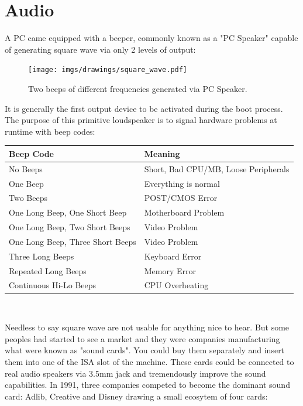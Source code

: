 \documentclass[book.tex]{subfiles}
\begin{document}
\section{Audio}
A PC came equipped with a beeper, commonly known as a "PC Speaker" capable of generating square wave via only 2 levels of output:\\
\par
 \begin{figure}[H]
\centering
\texttt{[image: imgs/drawings/square\_wave.pdf]}
\caption{Two beeps of different frequencies generated via PC Speaker.}
\end{figure}

\par
 It is generally the first output device to be activated during the boot process. The purpose of this primitive loudspeaker is to signal hardware problems at runtime with beep codes:\\
\par
\begin{tabularx}{\textwidth}{l l}
\textbf{Beep Code} & \textbf{Meaning}  \\ \hline
No Beeps                         & Short, Bad CPU/MB, Loose Peripherals \\ \hline
One Beep                         & Everything is normal\\ \hline
Two Beeps                        & POST/CMOS Error \\ \hline 
One Long Beep, One Short Beep    & Motherboard Problem \\ \hline
One Long Beep, Two Short Beeps   & Video Problem \\ \hline
One Long Beep, Three Short Beeps & Video Problem \\ \hline
Three Long Beeps                 & Keyboard Error \\ \hline
Repeated Long Beeps              & Memory Error \\ \hline
Continuous Hi-Lo Beeps           & CPU Overheating \\ \hline
\end{tabularx}\\
\bigskip
\par
Needless to say square wave are not usable for anything nice to hear. But some peoples had started to see a market and they were companies manufacturing what were known as "sound cards". You could buy them separately and insert them into one of the ISA slot of the machine. These cards could be connected to real audio speakers via 3.5mm jack and tremendously improve the sound capabilities. In 1991, three companies competed to become the dominant sound card: Adlib, Creative and Disney drawing a small ecosytem of four cards:\\
\end{document}
